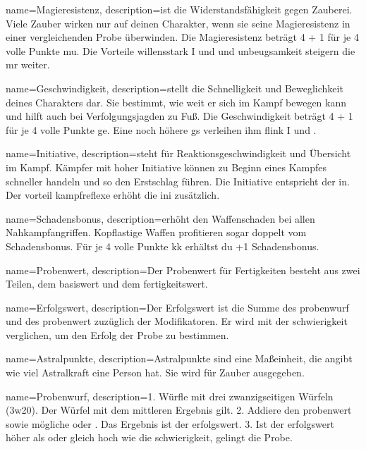 {
    name={Magieresistenz},
    description={ist die Widerstandsfähigkeit gegen Zauberei. Viele Zauber wirken nur auf deinen Charakter, wenn sie seine Magieresistenz in einer vergleichenden Probe überwinden. Die Magieresistenz beträgt 4 + 1 für je 4 volle Punkte \gls{mu}. Die Vorteile \gls{willensstark I} und  und \gls{unbeugsamkeit} steigern die \gls{mr} weiter.}}

{
    name={Geschwindigkeit},
    description={stellt die Schnelligkeit und Beweglichkeit deines Charakters dar. Sie bestimmt, wie weit er sich im Kampf bewegen kann und hilft auch bei Verfolgungsjagden zu Fuß. Die Geschwindigkeit beträgt 4 + 1 für je 4 volle Punkte \gls{ge}. Eine noch höhere \gls{gs} verleihen ihm \gls{flink I} und .}}

{
    name={Initiative},
    description={steht für Reaktionsgeschwindigkeit und Übersicht im Kampf. Kämpfer mit hoher Initiative können zu Beginn eines Kampfes schneller handeln und so den Erstschlag führen. Die Initiative entspricht der \gls{in}. Der \gls{vorteil} \gls{kampfreflexe} erhöht die \gls{ini} zusätzlich.}}

{
    name={Schadensbonus},
    description={erhöht den Waffenschaden bei allen Nahkampfangriffen. Kopflastige Waffen profitieren sogar doppelt vom Schadensbonus. Für je 4 volle Punkte \gls{kk} erhältst du +1 Schadensbonus.}}

{
    name={Probenwert},
    description={Der Probenwert für Fertigkeiten besteht aus zwei Teilen, dem \gls{basiswert} und dem \gls{fertigkeitswert}.}}

{
    name={Erfolgswert},
    description={Der Erfolgswert ist die Summe des \gls{probenwurf} und des \gls{probenwert} zuzüglich der Modifikatoren. Er wird mit der \gls{schwierigkeit} verglichen, um den Erfolg der Probe zu bestimmen.}}

{
    name={Astralpunkte},
    description={Astralpunkte sind eine Maßeinheit, die angibt wie viel Astralkraft eine Person hat. Sie wird für Zauber ausgegeben.}}

{
    name={Probenwurf},
    description={1. Würfle mit drei zwanzigseitigen Würfeln (\gls{3w20}). Der
Würfel mit dem mittleren Ergebnis gilt. 2. Addiere den \gls{probenwert} sowie
mögliche  oder . Das
Ergebnis ist der \gls{erfolgswert}. 3. Ist der \gls{erfolgswert} höher als oder gleich hoch wie die
\gls{schwierigkeit}, gelingt die Probe.}}

